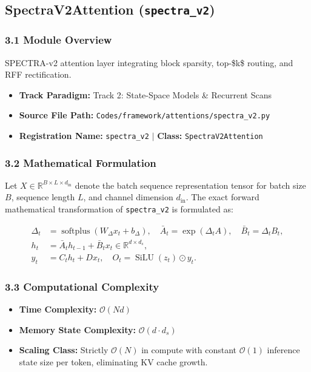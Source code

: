\subsection{SpectraV2Attention (\texttt{spectra\_v2})}
\label{sec:app_module_spectra_v2}

\subsubsection*{3.1 Module Overview}
SPECTRA-v2 attention layer integrating block sparsity, top-\$k\$ routing, and RFF rectification.
\begin{itemize}
    \item \textbf{Track Paradigm:} Track 2: State-Space Models & Recurrent Scans
    \item \textbf{Source File Path:} \texttt{Codes/framework/attentions/spectra\_v2.py}
    \item \textbf{Registration Name:} \texttt{spectra\_v2} $\mid$ \textbf{Class:} \texttt{SpectraV2Attention}
\end{itemize}

\subsubsection*{3.2 Mathematical Formulation}
Let $X \in \mathbb{R}^{B \times L \times d_{\text{in}}}$ denote the batch sequence representation tensor for batch size $B$, sequence length $L$, and channel dimension $d_{\text{in}}$. The exact forward mathematical transformation of \texttt{spectra\_v2} is formulated as:

\begin{align}
\Delta_t &= \operatorname{softplus}(W_\Delta x_t + b_\Delta), \quad \bar{A}_t = \exp(\Delta_t A), \quad \bar{B}_t = \Delta_t B_t, \\
h_t &= \bar{A}_t h_{t-1} + \bar{B}_t x_t \in \mathbb{R}^{d \times d_s}, \\
y_t &= C_t h_t + D x_t, \quad O_t = \operatorname{SiLU}(z_t) \odot y_t.
\end{align}


\subsubsection*{3.3 Computational Complexity}
\begin{itemize}
    \item \textbf{Time Complexity:} $\mathcal{O}(N d)$
    \item \textbf{Memory State Complexity:} $\mathcal{O}(d \cdot d_s)$
    \item \textbf{Scaling Class:} Strictly $\mathcal{O}(N)$ in compute with constant $\mathcal{O}(1)$ inference state size per token, eliminating KV cache growth.
\end{itemize}

